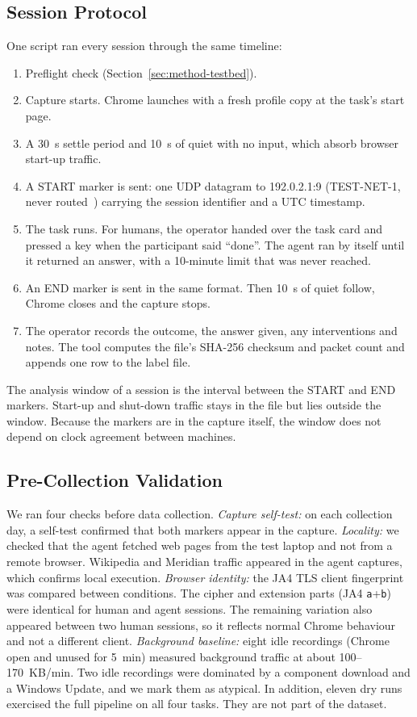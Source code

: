 \subsection{Session Protocol}
\label{sec:method-protocol}
One script ran every session through the same timeline:
\begin{enumerate}
\item Preflight check (Section~\ref{sec:method-testbed}).
\item Capture starts. Chrome launches with a fresh profile copy at the task's start page.
\item A 30~s settle period and 10~s of quiet with no input, which absorb browser start-up traffic.
\item A START marker is sent: one UDP datagram to 192.0.2.1:9 (TEST-NET-1, never routed~\cite{rfc5737}) carrying the session identifier and a UTC timestamp.
\item The task runs. For humans, the operator handed over the task card and pressed a key when the participant said ``done''. The agent ran by itself until it returned an answer, with a 10-minute limit that was never reached.
\item An END marker is sent in the same format. Then 10~s of quiet follow, Chrome closes and the capture stops.
\item The operator records the outcome, the answer given, any interventions and notes. The tool computes the file's SHA-256 checksum and packet count and appends one row to the label file.
\end{enumerate}
The analysis window of a session is the interval between the START and END markers. Start-up and shut-down traffic stays in the file but lies outside the window. Because the markers are in the capture itself, the window does not depend on clock agreement between machines.

\subsection{Pre-Collection Validation}
\label{sec:method-validation}
We ran four checks before data collection.
\textit{Capture self-test:} on each collection day, a self-test confirmed that both markers appear in the capture.
\textit{Locality:} we checked that the agent fetched web pages from the test laptop and not from a remote browser. Wikipedia and Meridian traffic appeared in the agent captures, which confirms local execution.
\textit{Browser identity:} the JA4 TLS client fingerprint~\cite{ja4} was compared between conditions. The cipher and extension parts (JA4 \texttt{a}+\texttt{b}) were identical for human and agent sessions. The remaining variation also appeared between two human sessions, so it reflects normal Chrome behaviour and not a different client.
\textit{Background baseline:} eight idle recordings (Chrome open and unused for 5~min) measured background traffic at about 100--170~KB/min. Two idle recordings were dominated by a component download and a Windows Update, and we mark them as atypical.
In addition, eleven dry runs exercised the full pipeline on all four tasks. They are not part of the dataset.

